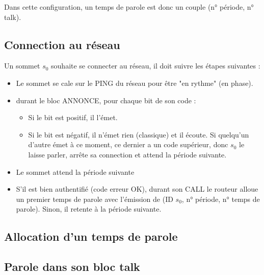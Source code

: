 \documentclass{article}
\begin{document}
Dans cette configuration, un temps de parole est donc un couple (n° période, n° talk).


\subsection{Connection au réseau}

Un sommet $s_0$ souhaite se connecter au réseau, il doit suivre les étapes suivantes :

\begin{itemize}
    \item Le sommet se cale sur le PING du réseau pour être "en rythme" (en phase).
    \item durant le bloc ANNONCE, pour chaque bit de son code :
    \begin{itemize}
        \item Si le bit est positif, il l'émet.
        \item Si le bit est négatif, il n'émet rien (classique) et il écoute. Si quelqu'un d'autre émet à ce moment, ce dernier a un code supérieur, donc $s_0$ le laisse parler, arrête sa connection et attend la période suivante.
    \end{itemize}
    \item Le sommet attend la période suivante
    \item S'il est bien authentifié (code erreur OK), durant son CALL le routeur alloue un premier temps de parole avec l'émission de (ID $s_0$, n° période, n° temps de parole). Sinon, il retente à la période suivante.
\end{itemize}


\subsection{Allocation d'un temps de parole}




\subsection{Parole dans son bloc talk}
\end{document}
